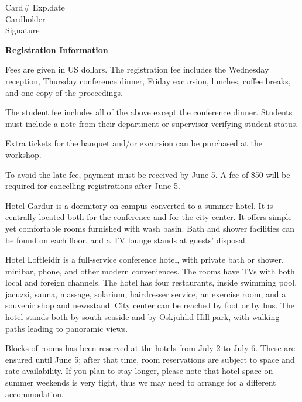 \addtolength{\baselineskip}{2mm}

 \hspace*{2em}  Card\# \dotfill Exp.date \dotfill \\
 \hspace*{2em}  Cardholder \dotfill \\
 \hspace*{2em}  Signature \dotfill

\addtolength{\baselineskip}{-2mm}

\newpage
{\normalsize\bf Registration Information}

Fees are given in US dollars. The registration fee includes the
Wednesday reception, Thursday conference dinner, Friday excursion,
lunches, coffee breaks, and one copy of the proceedings.

The student fee includes all of the above except the conference
dinner.  Students must include a note from their department or
supervisor verifying student status.

Extra tickets for the banquet and/or excursion can be purchased at the
workshop.

To avoid the late fee, payment must be received by June 5.  A fee
of \$50 will be required for cancelling registrations after June 5.



Hotel Gardur is a dormitory on campus converted to a summer hotel. It
is centrally located both for the conference and for the city center.
It offers simple yet comfortable rooms furnished with wash basin. Bath
and shower facilities can be found on each floor, and a TV lounge
stands at guests' disposal.

Hotel Loftleidir is a full-service conference hotel, with private bath
or shower, minibar, phone, and other modern conveniences. The rooms
have TVs with both local and foreign channels. The hotel has four
restaurants, inside swimming pool, jacuzzi, sauna, massage, solarium,
hairdresser service, an exercise room, and a souvenir shop and
newsstand. City center can be reached by foot or by bus. The hotel
stands both by south seaside and by Oskjuhlid Hill park, with walking
paths leading to panoramic views.

Blocks of rooms has been reserved at the hotels from July 2 to July 6.
These are ensured until June 5; after that time, room reservations are
subject to space and rate availability.  If you plan to stay longer,
please note that hotel space on summer weekends is very tight, thus
we may need to arrange for a different accommodation.

